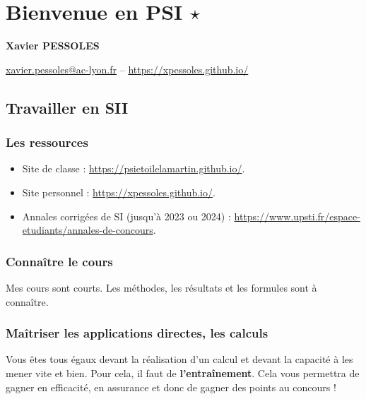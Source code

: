 \renewcommand{\repExo}{\repRel/PSI_Cy_01_ModelisationSystemes/Ch_02_RevisionsSLCI/}
\renewcommand{\nomExo}{01_Modelisation_Perf_Fiche}
\graphicspath{{\repStyle/png}{\repExo\nomExo/images}}
%


\setchapterpreamble[u]{\margintoc}

\chapter*{Bienvenue en PSI $\star$}
\setcounter{chapter}{1}

\begin{center}
\Large
\textsf{\textbf{Xavier PESSOLES}}
\normalsize 

\vspace{.5cm} 

\url{xavier.pessoles@ac-lyon.fr} -- \url{https://xpessoles.github.io/}
\normalsize
\end{center}
\section{Travailler en SII}
\subsection{Les ressources}
\begin{itemize}
\item Site de classe :  \url{https://psietoilelamartin.github.io/}.
\item Site personnel : \url{https://xpessoles.github.io/}.
\item Annales corrigées de SI (jusqu'à 2023 ou 2024) : \url{https://www.upsti.fr/espace-etudiants/annales-de-concours}. 

\end{itemize}
\subsection{Connaître le cours}
Mes cours sont courts. Les méthodes, les résultats et les formules sont à connaître. 

\subsection{Maîtriser les applications directes, les calculs}
Vous êtes tous égaux devant la réalisation d'un calcul et devant la capacité à les mener vite et bien. 
Pour cela, il faut de \textbf{l’entraînement}. Cela vous permettra de gagner en efficacité, en assurance et donc de gagner des points au concours !

